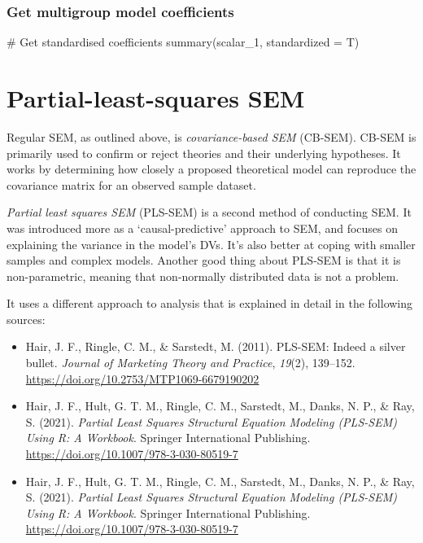 \documentclass[
  letterpaper,
  DIV=11,
  numbers=noendperiod]{scrreprt}
\newenvironment{Shaded}{\begin{snugshade}}{\end{snugshade}}
\newcommand{\AttributeTok}[1]{\textcolor[rgb]{0.40,0.45,0.13}{#1}}
\newcommand{\CommentTok}[1]{\textcolor[rgb]{0.37,0.37,0.37}{#1}}
\newcommand{\FunctionTok}[1]{\textcolor[rgb]{0.28,0.35,0.67}{#1}}
\newcommand{\NormalTok}[1]{\textcolor[rgb]{0.00,0.23,0.31}{#1}}
\begin{document}
\subsubsection{Get multigroup model
coefficients}\label{get-multigroup-model-coefficients}

\begin{Shaded}
\begin{Highlighting}[]
\CommentTok{\# Get standardised coefficients}
\FunctionTok{summary}\NormalTok{(scalar\_1, }\AttributeTok{standardized =}\NormalTok{ T)}
\end{Highlighting}
\end{Shaded}

\section{Partial-least-squares SEM}\label{partial-least-squares-sem}

Regular SEM, as outlined above, is \emph{covariance-based SEM} (CB-SEM).
CB-SEM is primarily used to confirm or reject theories and their
underlying hypotheses. It works by determining how closely a proposed
theoretical model can reproduce the covariance matrix for an observed
sample dataset.

\emph{Partial least squares SEM} (PLS-SEM) is a second method of
conducting SEM. It was introduced more as a `causal-predictive' approach
to SEM, and focuses on explaining the variance in the model's DVs. It's
also better at coping with smaller samples and complex models. Another
good thing about PLS-SEM is that it is non-parametric, meaning that
non-normally distributed data is not a problem.

It uses a different approach to analysis that is explained in detail in
the following sources:

\begin{itemize}
\item
  Hair, J. F., Ringle, C. M., \& Sarstedt, M. (2011). PLS-SEM: Indeed a
  silver bullet. \emph{Journal of Marketing Theory and Practice},
  \emph{19}(2), 139--152.
  \url{https://doi.org/10.2753/MTP1069-6679190202}
\item
  Hair, J. F., Hult, G. T. M., Ringle, C. M., Sarstedt, M., Danks, N.
  P., \& Ray, S. (2021). \emph{Partial Least Squares Structural Equation
  Modeling (PLS-SEM) Using R: A Workbook}. Springer International
  Publishing. \url{https://doi.org/10.1007/978-3-030-80519-7}
\item
  Hair, J. F., Hult, G. T. M., Ringle, C. M., Sarstedt, M., Danks, N.
  P., \& Ray, S. (2021). \emph{Partial Least Squares Structural Equation
  Modeling (PLS-SEM) Using R: A Workbook}. Springer International
  Publishing. \url{https://doi.org/10.1007/978-3-030-80519-7}
\end{itemize}
\end{document}

